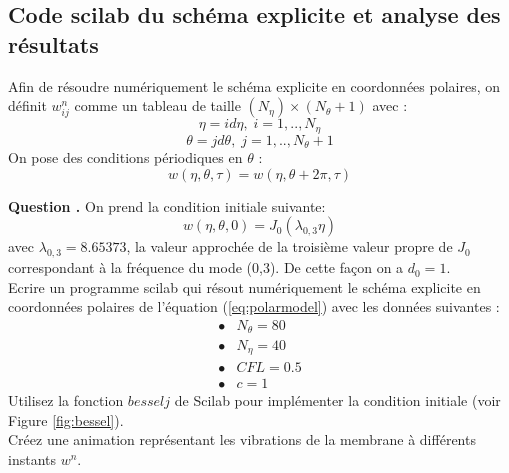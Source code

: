 \documentclass[a4,12pt]{article}
\newcounter{Nbquestion}
\newcommand*\question{%
\stepcounter{Nbquestion}%
\textbf{Question \theNbquestion. }}
\begin{document}
\newpage 

\subsection{Code scilab du schéma explicite et analyse des résultats}

Afin de résoudre numériquement le schéma explicite en coordonnées polaires, on définit $w_{ij}^n$ comme un tableau de taille $(N_\eta)\times(N_\theta+1)$ avec :
\[
\eta=id\eta ,\;i=1,..,N_\eta
\]
\[
\theta=jd\theta ,\;j=1,..,N_\theta+1
\]
On pose des conditions périodiques en $\theta$ :
\[
w(\eta,\theta,\tau)=w(\eta,\theta+2\pi,\tau)
\]


\begin{mdframed}[style=exampledefault]
\question On prend la condition initiale suivante:
\begin{equation}
	w(\eta,\theta,0)=J_0(\lambda_{0,3}\eta)
	\label{eq:condinit}
\end{equation}
avec $\lambda_{0,3}=8.65373$, la valeur approchée de la troisième valeur propre de $J_0$ correspondant à la fréquence du mode (0,3). De cette façon on a $d_0=1$.\\

Ecrire un programme scilab qui résout numériquement le schéma explicite en coordonnées polaires de l'équation (\ref{eq:polarmodel}) avec les données suivantes : 
\[
\begin{array}{ll}
	\bullet & N_\theta=80 \\ 
	\bullet & N_\eta=40 \\ 
	\bullet & CFL=0.5 \\ 
	\bullet & c=1
\end{array}
\]
Utilisez la fonction $besselj$ de Scilab pour implémenter la condition initiale (voir Figure \ref{fig:bessel}).\\
Créez une animation représentant les vibrations de la membrane à différents instants $w^n$.
\end{mdframed}

\end{document}
